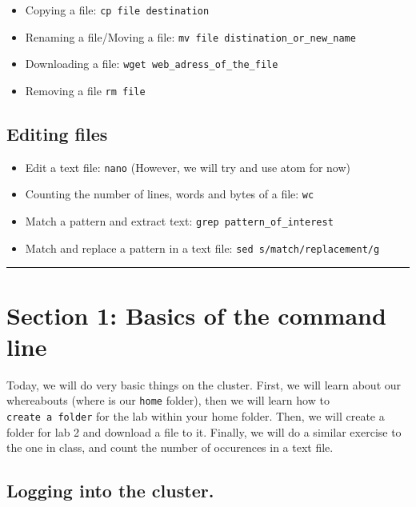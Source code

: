 \documentclass[
]{book}
\providecommand{\tightlist}{%
  \setlength{\itemsep}{0pt}\setlength{\parskip}{0pt}}
\begin{document}
\begin{itemize}
\tightlist
\item
  Copying a file: \texttt{cp\ file\ destination}
\item
  Renaming a file/Moving a file: \texttt{mv\ file\ distination\_or\_new\_name}
\item
  Downloading a file: \texttt{wget\ web\_adress\_of\_the\_file}
\item
  Removing a file \texttt{rm\ file}
\end{itemize}

\hypertarget{editing-files}{%
\subsection{Editing files}\label{editing-files}}

\begin{itemize}
\tightlist
\item
  Edit a text file: \texttt{nano} (However, we will try and use atom for now)
\item
  Counting the number of lines, words and bytes of a file: \texttt{wc}
\item
  Match a pattern and extract text: \texttt{grep\ pattern\_of\_interest}
\item
  Match and replace a pattern in a text file: \texttt{sed\ \textquotesingle{}s/match/replacement/g\textquotesingle{}}
\end{itemize}

\begin{center}\rule{0.5\linewidth}{0.5pt}\end{center}

\hypertarget{section-1-basics-of-the-command-line}{%
\section{Section 1: Basics of the command line}\label{section-1-basics-of-the-command-line}}

Today, we will do very basic things on the cluster. First, we will learn about our whereabouts (where is our \texttt{home} folder), then we will learn how to \texttt{create\ a\ folder} for the lab within your home folder. Then, we will create a folder for lab 2 and download a file to it. Finally, we will do a similar exercise to the one in class, and count the number of occurences in a text file.

\hypertarget{logging-into-the-cluster.}{%
\subsection{Logging into the cluster.}\label{logging-into-the-cluster.}}
\end{document}
